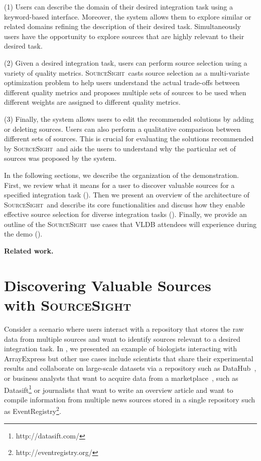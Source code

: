 \documentclass{vldb}
\newcommand\system{\textsc{SourceSight}}
\begin{document}
\vspace{2pt}\noindent (1) Users can describe the domain of their desired integration task using a keyword-based interface. Moreover, the system allows them to explore similar or related domains refining the description of their desired task. Simultaneously users have the opportunity to explore sources that are highly relevant to their desired task.

\vspace{2pt}\noindent (2) Given a desired integration task, users can perform source selection using a variety of quality metrics. \system~casts source selection as a multi-variate optimization problem to help users understand the actual trade-offs between different quality metrics and proposes multiple sets of sources to be used when different weights are assigned to different quality metrics. 

\vspace{2pt}\noindent (3) Finally, the system allows users to edit the recommended solutions by adding or deleting sources. Users can also perform a qualitative comparison between different sets of sources. This is crucial for evaluating the solutions recommended by \system~and aids the users to understand why the particular set of sources was proposed by the system.

In the following sections, we describe the organization of the demonstration. First, we review what it means for a user to discover valuable sources for a specified integration task (). Then we present an overview of the architecture of \system~and describe its core functionalities and discuss how they enable effective source selection for diverse integration tasks (). Finally, we provide an outline of the \system~use cases that VLDB attendees will experience during the demo ().

\vspace{2pt}\noindent\textbf{Related work.}

\section{Discovering Valuable Sources \\ with {\Large \system}}
Consider a scenario where users interact with a repository that stores the raw data from multiple sources and want to identify sources relevant to a desired integration task. In , we presented an example of biologists interacting with ArrayExpress but other use cases include scientists that share their experimental results and collaborate on large-scale datasets via a repository such as DataHub~\cite{datahub}, or business analysts that want to acquire data from a marketplace~\cite{balazinska:vldb11}, such as Datasift\footnote{http://datasift.com/} or journalists that want to write an overview article and want to compile information from multiple news sources stored in a single repository such as EventRegistry\footnote{http://eventregistry.org/}. 
\end{document}
